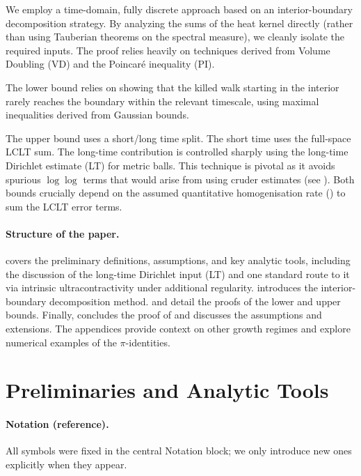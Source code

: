 \documentclass[reqno]{amsart}
\numberwithin{equation}{section}
\theoremstyle{definition}
\theoremstyle{remark}
\begin{document}
We employ a time-domain, fully discrete approach based on an interior-boundary decomposition strategy. By analyzing the sums of the heat kernel directly (rather than using Tauberian theorems on the spectral measure), we cleanly isolate the required inputs. The proof relies heavily on techniques derived from Volume Doubling (VD) and the Poincaré inequality (PI).

The lower bound relies on showing that the killed walk starting in the interior rarely reaches the boundary within the relevant timescale, using maximal inequalities derived from Gaussian bounds.

The upper bound uses a short/long time split. The short time uses the full-space LCLT sum. The long-time contribution is controlled sharply using the long-time Dirichlet estimate (LT) for metric balls. This technique is pivotal as it avoids spurious $\log\log$ terms that would arise from using cruder estimates (see ). Both bounds crucially depend on the assumed quantitative homogenisation rate () to sum the LCLT error terms.

\paragraph{Structure of the paper.}
 covers the preliminary definitions, assumptions, and key analytic tools, including the discussion of the long-time Dirichlet input (LT) and one standard route to it via intrinsic ultracontractivity under additional regularity.  introduces the interior-boundary decomposition method.  and  detail the proofs of the lower and upper bounds. Finally,  concludes the proof of  and discusses the assumptions and extensions. The appendices provide context on other growth regimes and explore numerical examples of the $\pi$-identities.


\section{Preliminaries and Analytic Tools}\label{sec:prelim}


\paragraph{Notation (reference).} All symbols were fixed in the central Notation block; we only introduce new ones explicitly when they appear.
\end{document}
